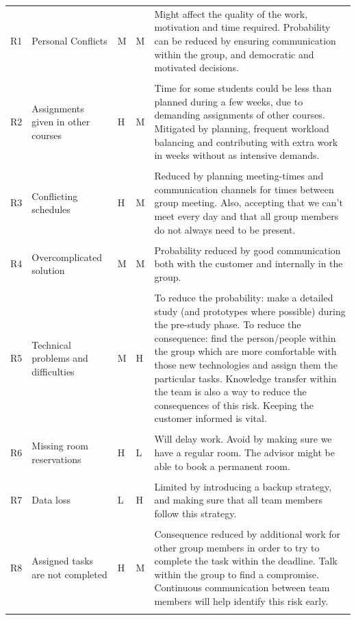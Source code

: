 \documentclass[11pt,a4paper,titlepage,oneside]{report}
\begin{document}
\begin{longtable}{p{0.7cm} p{2.5cm} p{0.7cm} p{0.7cm} p{6.5cm} }
  \hline
R1 & Personal Conflicts & \gls{M} & \gls{M} & Might affect the quality of the work, motivation and time required. Probability can be reduced by ensuring communication within the group, and democratic and motivated decisions. \\ \\ \hline
R2 & Assignments given in other courses & \gls{H} & \gls{M} & Time for some students could be less than planned during a few weeks, due to demanding assignments of other courses. Mitigated by planning, frequent workload balancing and contributing with extra work in weeks without as intensive demands. \\ \\ \hline
R3 & Conflicting schedules & \gls{H} & \gls{M} & Reduced by planning meeting-times and communication channels for times between group meeting. Also, accepting that we can't meet every day and that all group members do not always need to be present. \\ \\ \hline
R4 & Overcomplicated solution & \gls{M} & \gls{M} & Probability reduced by good communication both with the customer and internally in the group. \\ \\ \hline
R5 & Technical problems and difficulties & \gls{M} & \gls{H} & To reduce the probability: make a detailed study (and \glspl{prototype} where possible) during the \gls{pre-study} phase. To reduce the consequence: find the person/people within the group which are more comfortable with those new technologies and assign them the particular tasks. Knowledge transfer within the team is also a way to reduce the consequences of this risk. Keeping the customer informed is vital. \\ \\ \hline
R6 & Missing room reservations & \gls{H} & \gls{L} & Will delay work. Avoid by making sure we have a regular room. The advisor might be able to book a permanent room. \\ \\ \hline
R7 & Data loss & \gls{L} & \gls{H} & Limited by introducing a backup strategy, and making sure that all team members follow this strategy. \\ \\ \hline
R8 & Assigned tasks are not completed & \gls{H} & \gls{M} & Consequence reduced by additional work for other group members in order to try to complete the task within the deadline. Talk within the group to find a compromise. Continuous communication between team members will help identify this risk early.  \\ \\ \hline

\end{longtable}
\end{document}
